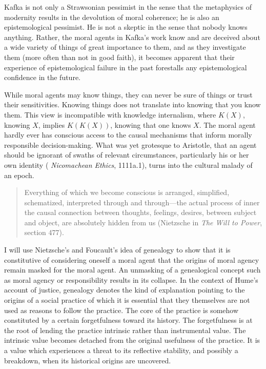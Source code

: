 \documentclass[11pt]{article}
\begin{document}
Kafka is not only a Strawsonian pessimist in the sense that the
metaphysics of modernity results in the devolution of moral coherence;
he is also an epistemological pessimist. He is not a skeptic in the
sense that nobody knows anything. Rather, the moral agents in Kafka's
work know and are deceived about a wide variety of things of great
importance to them, and as they investigate them (more often than not
in good faith), it becomes apparent that their experience of
epistemological failure in the past forestalls any epistemological
confidence in the future.

While moral agents may know things, they can never be sure of
things or trust their sensitivities. Knowing things does not
translate into knowing that you know them. This view is
incompatible with knowledge internalism, where $K(X)$, knowing
$X$, implies $K(K(X))$, knowing that one knows $X$. The moral
agent hardly ever has conscious access to the causal mechanisms
that inform morally responsible decision-making. What was yet
grotesque to Aristotle, that an agent should be ignorant of swaths
of relevant circumstances, particularly his or her own identity
( \emph{Nicomachean Ethics},
1111a.1), turns into the cultural malady of an epoch.

\begin{quote}
  Everything of which we become conscious is arranged, simplified,
  schematized, interpreted through and through---the actual process of
  inner  the causal connection between thoughts,
  feelings, desires, between subject and object, are absolutely hidden
  from us (Nietzsche in \emph{The Will to Power}, section 477).
\end{quote}

I will use Nietzsche's and Foucault's idea of genealogy to show that
it is constitutive of considering oneself a moral agent that the
origins of moral agency remain masked for the moral agent. An
unmasking of a genealogical concept such as moral agency or
responsibility results in its collapse. In the context of Hume's
account of justice, genealogy denotes the kind of explanation pointing
to the origins of a social practice of which it is essential that they
themselves are not used as reasons to follow the practice. The core of
the practice is somehow constituted by a certain forgetfulness toward
its history. The forgetfulness is at the root of lending the practice
intrinsic rather than instrumental value. The intrinsic value becomes
detached from the original usefulness of the practice. It is a value
which experiences a threat to its reflective stability, and possibly a
breakdown, when its historical origins are uncovered.
\end{document}
